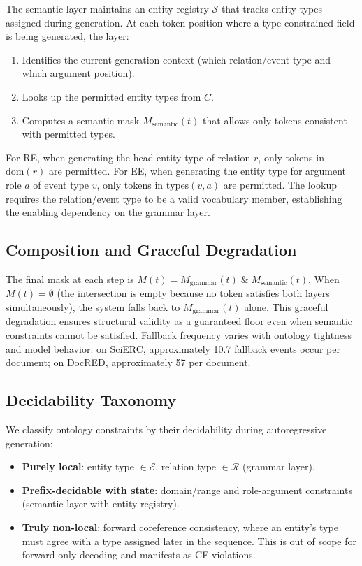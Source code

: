 \documentclass[11pt,a4paper]{article}
\newcommand{\cfsym}{\textsc{CF}}
\begin{document}
The semantic layer maintains an entity registry $\mathcal{S}$ that tracks entity types assigned during generation. At each token position where a type-constrained field is being generated, the layer:
\begin{enumerate}[nosep]
\item Identifies the current generation context (which relation/event type and which argument position).
\item Looks up the permitted entity types from $C$.
\item Computes a semantic mask $M_\text{semantic}(t)$ that allows only tokens consistent with permitted types.
\end{enumerate}

For RE, when generating the head entity type of relation $r$, only tokens in $\text{dom}(r)$ are permitted. For EE, when generating the entity type for argument role $a$ of event type $v$, only tokens in $\text{types}(v, a)$ are permitted. The lookup requires the relation/event type to be a valid vocabulary member, establishing the enabling dependency on the grammar layer.

\subsection{Composition and Graceful Degradation}

The final mask at each step is $M(t) = M_\text{grammar}(t) \;\&\; M_\text{semantic}(t)$. When $M(t) = \emptyset$ (the intersection is empty because no token satisfies both layers simultaneously), the system falls back to $M_\text{grammar}(t)$ alone. This graceful degradation ensures structural validity as a guaranteed floor even when semantic constraints cannot be satisfied. Fallback frequency varies with ontology tightness and model behavior: on SciERC, approximately 10.7 fallback events occur per document; on DocRED, approximately 57 per document.

\subsection{Decidability Taxonomy}

We classify ontology constraints by their decidability during autoregressive generation:
\begin{itemize}[nosep,leftmargin=*]
\item \textbf{Purely local}: entity type $\in \mathcal{E}$, relation type $\in \mathcal{R}$ (grammar layer).
\item \textbf{Prefix-decidable with state}: domain/range and role-argument constraints (semantic layer with entity registry).
\item \textbf{Truly non-local}: forward coreference consistency, where an entity's type must agree with a type assigned later in the sequence. This is out of scope for forward-only decoding and manifests as \cfsym{} violations.
\end{itemize}
\end{document}

